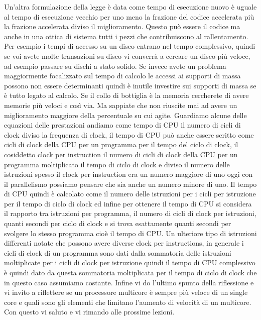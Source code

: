 Un'altra formulazione della legge è data come tempo di esecuzione nuovo è uguale al tempo di esecuzione vecchio per uno meno la frazione del codice accelerata più la frazione accelerata diviso il miglioramento.
Questo può essere il codice ma anche in una ottica di sistema tutti i pezzi che contribuiscono al rallentamento.
Per esempio i tempi di accesso su un disco entrano nel tempo complessivo, quindi se voi avete molte transazioni su disco vi converrà a cercare un disco più veloce, ad esempio passare su dischi a stato solido.
Se invece avete un problema maggiormente focalizzato sul tempo di calcolo le accessi ai supporti di massa possono non essere determinanti quindi è inutile investire sui supporti di massa se è tutto legato al calcolo.
Se il collo di bottiglia è la memoria cercherete di avere memorie più veloci e così via.
Ma sappiate che non riuscite mai ad avere un miglioramento maggiore della percentuale su cui agite.
Guardiamo alcune delle equazioni delle prestazioni andiamo come tempo di CPU il numero di cicli di clock diviso la frequenza di clock, il tempo di CPU può anche essere scritto come cicli di clock della CPU per un programma per il tempo del ciclo di clock, il cosiddetto clock per instruction il numero di cicli di clock della CPU per un programma moltiplicato il tempo di ciclo di clock e diviso il numero delle istruzioni spesso il clock per instruction era un numero maggiore di uno oggi con il parallelismo possiamo pensare che sia anche un numero minore di uno.
Il tempo di CPU quindi è calcolato come il numero delle istruzioni per i cicli per istruzione per il tempo di ciclo di clock ed infine per ottenere il tempo di CPU si considera il rapporto tra istruzioni per programma, il numero di cicli di clock per istruzioni, quanti secondi per ciclo di clock e si trova esattamente quanti secondi per svolgere lo stesso programma cioè il tempo di CPU.
Un ulteriore tipo di istruzioni differenti notate che possono avere diverse clock per instructions, in generale i cicli di clock di un programma sono dati dalla sommatoria delle istruzioni moltiplicate per i cicli di clock per istruzione quindi il tempo di CPU complessivo è quindi dato da questa sommatoria moltiplicata per il tempo di ciclo di clock che in questo caso assumiamo costante.
Infine vi do l'ultimo spunto della riflessione e vi invito a riflettere se un processore multicore è sempre più veloce di un single core e quali sono gli elementi che limitano l'aumento di velocità di un multicore.
Con questo vi saluto e vi rimando alle prossime lezioni.